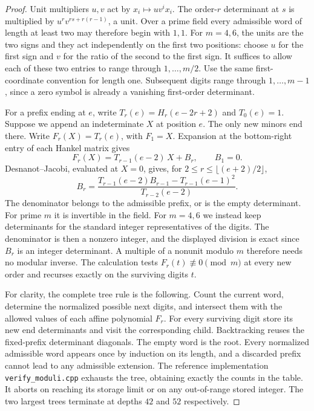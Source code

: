 \documentclass[11pt]{article}
\begin{document}
\begin{proof}
Unit multipliers $u,v$ act by $x_i\mapsto uv^ix_i$. The order-$r$ determinant at $s$ is multiplied by $u^rv^{rs+r(r-1)}$, a unit. Over a prime field every admissible word of length at least two may therefore begin with $1,1$. For $m=4,6$, the units are the two signs and they act independently on the first two positions: choose $u$ for the first sign and $v$ for the ratio of the second to the first sign. It suffices to allow each of these two entries to range through $1,\ldots,m/2$. Use the same first-coordinate convention for length one. Subsequent digits range through $1,\ldots,m-1$, since a zero symbol is already a vanishing first-order determinant.

For a prefix ending at $e$, write $T_r(e)=H_r(e-2r+2)$ and $T_0(e)=1$. Suppose we append an indeterminate $X$ at position $e$. The only new minors end there. Write $F_r(X)=T_r(e)$, with $F_1=X$. Expansion at the bottom-right entry of each Hankel matrix gives
\[
        F_r(X)=T_{r-1}(e-2)\,X+B_r,\qquad B_1=0 .
\]
Desnanot--Jacobi, evaluated at $X=0$, gives, for $2\le r\le \lfloor(e+2)/2\rfloor$,
\[
 B_r=\frac{T_{r-1}(e-2)B_{r-1}-T_{r-1}(e-1)^2}{T_{r-2}(e-2)}.
\]
The denominator belongs to the admissible prefix, or is the empty determinant. For prime $m$ it is invertible in the field. For $m=4,6$ we instead keep determinants for the standard integer representatives of the digits. The denominator is then a nonzero integer, and the displayed division is exact since $B_r$ is an integer determinant. A multiple of a nonunit modulo $m$ therefore needs no modular inverse. The calculation tests $F_r(t)\not\equiv0\pmod m$ at every new order and recurses exactly on the surviving digits $t$.

For clarity, the complete tree rule is the following. Count the current word, determine the normalized possible next digits, and intersect them with the allowed values of each affine polynomial $F_r$. For every surviving digit store its new end determinants and visit the corresponding child. Backtracking reuses the fixed-prefix determinant diagonals. The empty word is the root. Every normalized admissible word appears once by induction on its length, and a discarded prefix cannot lead to any admissible extension. The reference implementation \texttt{verify\_moduli.cpp} exhausts the tree, obtaining exactly the counts in the table. It aborts on reaching its storage limit or on any out-of-range stored integer. The two largest trees terminate at depths $42$ and $52$ respectively.


\end{proof}
\end{document}
